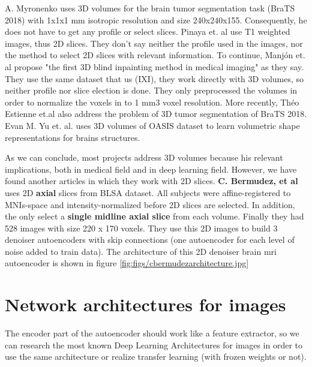 A. Myronenko \cite{myronenko20183d} uses 3D volumes for the brain tumor segmentation task (BraTS 2018) with 1x1x1 mm isotropic resolution and size 240x240x155. Consequently, he does not have to get any profile or select slices. Pinaya et. al \cite{pinaya2019} use T1 weighted images, thus 2D slices. They don't say neither the profile used in the images, nor the method to select 2D slices with relevant information. To continue, Manjón et. al \cite{2020inpainting} propose "the first 3D blind inpainting method in medical imaging" as they say. They use the same dataset that us (IXI), they work directly with 3D volumes, so neither profile nor slice election is done. They only preprocessed the volumes in order to normalize the voxels in to 1 mm3 voxel resolution. More recently, Théo Estienne et.al \cite{otherBraTS2020} also address the problem of 3D tumor segmentation of BraTS 2018. Evan M. Yu et. al. \cite{learnvolrepreCODE} uses 3D volumes of OASIS dataset to learn volumetric shape representations for brains structures.

As we can conclude, most projects address 3D volumes because his relevant implications, both in medical field and in deep learning field. However, we have found another articles in which they work with 2D slices. \textbf{C. Bermudez, et al} \cite{bermudez2018t1autoencoder} uses 2D \textbf{axial} slices from BLSA dataset. All subjects were affine-registered to MNIs-space and intensity-normalized before 2D slices are selected. In addition, the only select a \textbf{single midline axial slice} from each volume. Finally they had 528 images with size 220 x 170 voxels. They use this 2D images to build 3 denoiser autoencoders with skip connections (one autoencoder for each level of noise added to train data). The architecture of this 2D denoiser brain mri autoencoder is shown in figure \ref{fig:figs/cbermudezarchitecture.jpg}



\section{Network architectures for images}

The encoder part of the autoencoder should work like a feature extractor, so we can research the most known Deep Learning Architectures for images in order to use the same architecture or realize transfer learning (with frozen weights or not).

